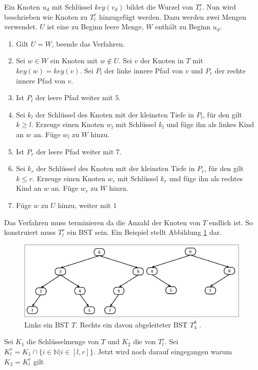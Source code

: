 \documentclass[a4paper,12pt]{article}
\begin{document}
\noindent Ein Knoten $u_d$ mit Schlüssel $\mathit{key}(v_d)$ bildet die Wurzel von $T^r_l$. Nun wird beschrieben wie Knoten zu $T^r_l$ hinzugefügt werden.
Dazu werden zwei Mengen verwendet. $U$ ist eine zu Beginn leere Menge, $W$ enthält zu Beginn $u_d$.
\begin{enumerate}
	\item Gilt $U = W$, beende das Verfahren.
	\item Sei $w \in W$ ein Knoten mit $w \notin U$.  Sei $v$ der Knoten in $T$ mit $\mathit{key}(w ) = \mathit{key}(v)$. Sei $P_l$ der linke innere Pfad von $v$ und $P_r$ der rechte innere Pfad von $v$.
	\item Ist $P_l$ der leere Pfad weiter mit $5$.
	\item Sei $k_l$ der Schlüssel des Knoten mit der kleinsten Tiefe in $P_l$, für den gilt $k \geq l$. Erzeuge einen Knoten $w_l$ mit Schlüssel $k_l$ und füge ihn als linkes Kind an $w$ an. Füge $w_l$ zu $W$ hinzu.
	\item Ist $P_r$ der leere Pfad weiter mit $7$.
	\item Sei $k_r$ der Schlüssel des Knoten mit der kleinsten Tiefe in $P_r$, für den gilt  $k \leq r$. Erzeuge einen Knoten $w_r$ mit Schlüssel $k_r$ und füge ihn als rechtes Kind an $w$ an. Füge $w_r$ zu $W$ hinzu.	
	\item Füge $w$ zu $U$ hinzu, weiter mit $1$
\end{enumerate}
Das Verfahren muss terminieren da die Anzahl der Knoten von $T$ endlich ist. So konstruiert muss $T^r_l$ ein BST sein. Ein Beispiel stellt Abbildung \ref{fig:T_r_l} dar. 
\begin{figure}[h]
	\centering
	\includegraphics[width= 1\textwidth]{"Medien/DynOpt/T_r_l"}
	\caption{Links ein BST $T$. Rechts ein davon abgeleiteter BST $T^8_4$ .  }
	\label{fig:T_r_l}
\end{figure}

\noindent Sei $K_1$ die Schlüsselmenge von $T$ und $K_2$ die von $T^r_l$. Sei ${K^r_l = K_1 \cap \{i \in \mathbb{N}\vert i \in \left[l,r\right] \}}$. Jetzt wird noch darauf eingegangen warum $K_2 = K^r_l$ gilt \\
\end{document}
